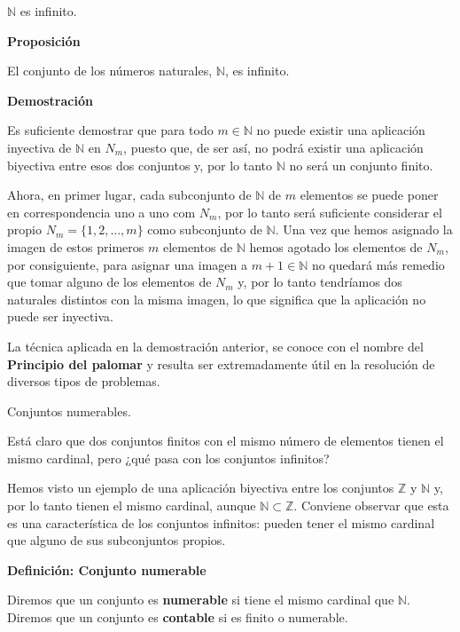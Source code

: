 \documentclass[ignorenonframetext,]{beamer}
\begin{document}
\begin{frame}{\(\mathbb{N}\) es infinito.}
\protect\hypertarget{mathbbn-es-infinito.}{}

 \textbf{Proposición}

El conjunto de los números naturales, \(\mathbb{N}\), es infinito.

\textbf{Demostración}

Es suficiente demostrar que para todo \(m \in \mathbb{N}\) no puede
existir una aplicación inyectiva de \(\mathbb{N}\) en \(N_m\), puesto
que, de ser así, no podrá existir una aplicación biyectiva entre esos
dos conjuntos y, por lo tanto \(\mathbb{N}\) no será un conjunto finito.

Ahora, en primer lugar, cada subconjunto de \(\mathbb{N}\) de \(m\)
elementos se puede poner en correspondencia uno a uno com \(N_m\), por
lo tanto será suficiente considerar el propio
\(N_m = \{1,2, \ldots, m\}\) como subconjunto de \(\mathbb{N}\). Una vez
que hemos asignado la imagen de estos primeros \(m\) elementos de
\(\mathbb{N}\) hemos agotado los elementos de \(N_m\), por consiguiente,
para asignar una imagen a \(m+1 \in \mathbb{N}\) no quedará más remedio
que tomar alguno de los elementos de \(N_m\) y, por lo tanto tendríamos
dos naturales distintos con la misma imagen, lo que significa que la
aplicación no puede ser inyectiva.

La técnica aplicada en la demostración anterior, se conoce con el nombre
del \textbf{Principio del palomar} y resulta ser extremadamente útil en
la resolución de diversos tipos de problemas.

\end{frame}

\begin{frame}{Conjuntos numerables.}
\protect\hypertarget{conjuntos-numerables.}{}

Está claro que dos conjuntos finitos con el mismo número de elementos
tienen el mismo cardinal, pero ¿qué pasa con los conjuntos infinitos?

Hemos visto un ejemplo de una aplicación biyectiva entre los conjuntos
\(\mathbb{Z}\) y \(\mathbb{N}\) y, por lo tanto tienen el mismo
cardinal, aunque \(\mathbb{N} \subset \mathbb{Z}\). Conviene observar
que esta es una característica de los conjuntos infinitos: pueden tener
el mismo cardinal que alguno de sus subconjuntos propios.

 \textbf{Definición: Conjunto numerable}

Diremos que un conjunto es \textbf{numerable} si tiene el mismo cardinal
que \(\mathbb{N}\). Diremos que un conjunto es \textbf{contable} si es
finito o numerable.

\end{frame}
\end{document}
